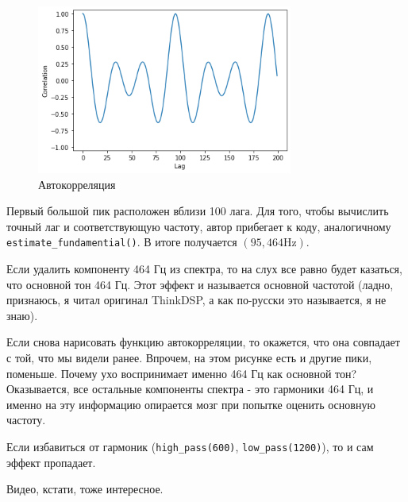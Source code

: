 \documentclass[a4paper,12pt]{report}
\begin{document}
    \begin{figure}[H]
        \centering
        \includegraphics[width=0.75\textwidth]{images/ex4_autocorr.png}
        \caption{Автокорреляция}
        \label{fig:ex4_autocorr}
    \end{figure}
    
    Первый большой пик расположен вблизи 100 лага. Для того, чтобы вычислить точный лаг и соответствующую частоту, автор прибегает к коду, аналогичному \texttt{estimate\_fundamential()}. В итоге получается $(95, 464\text{Hz})$.
    
    Если удалить компоненту 464 Гц из спектра, то на слух все равно будет казаться, что основной тон 464 Гц. Этот эффект и называется  основной частотой (ладно, признаюсь, я читал оригинал ThinkDSP, а как по-русски это называется, я не знаю).
    
    Если снова нарисовать функцию автокорреляции, то окажется, что она совпадает с той, что мы видели ранее. Впрочем, на этом рисунке есть и другие пики, поменьше. Почему ухо воспринимает именно 464 Гц как основной тон? Оказывается, все остальные компоненты спектра - это гармоники 464 Гц, и именно на эту информацию опирается мозг при попытке оценить  основную частоту.
    
    Если избавиться от гармоник (\texttt{high\_pass(600)}, \texttt{low\_pass(1200)}), то и сам эффект пропадает.
    
    Видео, кстати, тоже интересное.
    
    \printbibliography
    
\end{document}

